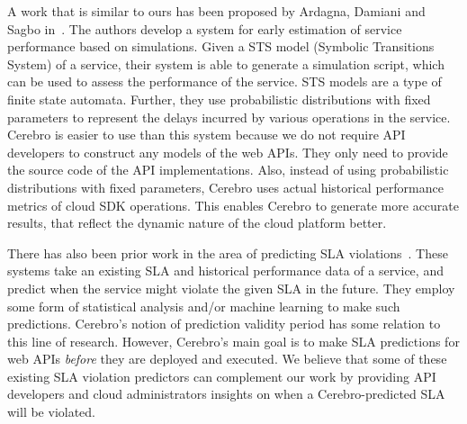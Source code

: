 A work that is similar to ours has been proposed by Ardagna, Damiani and Sagbo in~\cite{6649675}. 
The authors develop
a system for early estimation of service performance based on simulations. Given a STS
model (Symbolic Transitions System) of a service, their system is able to generate a simulation script, which
can be used to assess the performance of the service. STS models are a type of finite state automata. 
Further, they use probabilistic distributions with fixed parameters
to represent the delays incurred by various operations in the service. Cerebro is easier to use than this
system because we do not require API developers to construct any models of the web APIs. They only
need to provide the source code of the API implementations. Also, instead of using probabilistic distributions
with fixed parameters, Cerebro uses actual historical performance metrics of cloud SDK operations. This enables
Cerebro to generate more accurate results, that reflect the dynamic nature of the cloud platform better.

There has also been prior work in the area of predicting 
SLA violations~\cite{Leitner10,6976585,Duan:2006:PIP:1142473.1142582}. 
These systems take an existing SLA and historical performance data of a service, and predict when the 
service might violate the given SLA in the future. They employ some form of statistical analysis and/or machine learning to
make such predictions. Cerebro's notion of prediction validity period has some relation to this line of research. However,
Cerebro's main goal is to make SLA predictions for web APIs \textit{before} 
they are deployed and executed. We believe that
some of these existing SLA violation predictors can complement our 
work by providing API developers and cloud
administrators insights on when a Cerebro-predicted SLA will be violated.

